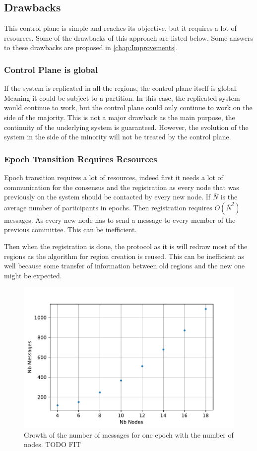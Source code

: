 \documentclass[a4paper,11pt,oneside]{report}
\begin{document}
\subsection{Drawbacks}
This control plane is simple and reaches its objective, but it requires a lot of
resources. Some of the drawbacks of this approach are listed below. 
Some answers to these drawbacks are proposed in \autoref{chap:Improvements}.  

\subsubsection{Control Plane is global}
If the system is replicated in all the regions, the control plane itself is
global. Meaning it could be subject to a partition. In this case, the replicated
system would continue to work, but the control plane could only continue to
work on the side of the majority. This is not a major drawback as the main
purpose, the continuity of the underlying system is guaranteed. However, the evolution of the system in the side of the minority will not be treated by the control plane.

\subsubsection{Epoch Transition Requires Resources}
Epoch transition requires a lot of resources, indeed first it needs a lot of
communication for the consensus and the registration as every node that was
previously on the system should be contacted by every new node. If $\bar{N}$ is
the average number of participants in epochs. Then registration 
requires $O(\bar{N}^2)$ messages. As every new node has to send a message
to every member of the previous committee. This can be inefficient. 

Then when the registration is done, the protocol as it is will redraw most of
the regions as the algorithm for region creation is reused. This can be
inefficient as well because some transfer of information between old regions and the new one might be expected.

\begin{figure}[!h] 
\centering
\includegraphics[width=350pt]{figures/messages-plot}
\caption{Growth of the number of messages for one epoch with the number of nodes. \color{red} TODO FIT \color{black}}
\label{fig:messages-plot}
\end{figure}
\end{document}
